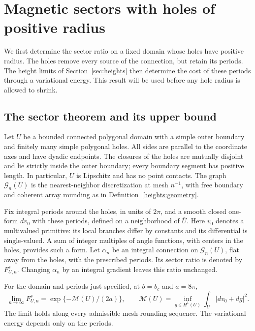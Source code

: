 \section{Magnetic sectors with holes of positive radius}
\label{sec:sectors}

We first determine the sector ratio on a fixed domain whose holes have
positive radius. The holes remove every source of the connection, but
retain its periods. The height limits of Section~\ref{sec:heights} then
determine the cost of these periods through a variational energy.
This result will be used before any hole radius is allowed to shrink.

\subsection{The sector theorem and its upper bound}

Let \(U\) be a bounded connected polygonal domain with a simple outer
boundary and finitely many simple polygonal holes. All sides are parallel
to the coordinate axes and have dyadic endpoints. The closures of the
holes are mutually disjoint and lie strictly inside the outer boundary;
every boundary segment has positive length. In particular, \(U\) is
Lipschitz and has no point contacts.
The graph \(\mathcal G_n(U)\) is the nearest-neighbor discretization at mesh
\(n^{-1}\), with free boundary and coherent array rounding as in
Definition~\ref{heights:geometry}.

Fix integral periods around the holes, in units of \(2\pi\), and a smooth
closed one-form \(dv_0\) with these periods, defined on a neighborhood
of \(\overline U\). Here \(v_0\) denotes a multivalued primitive:
its local branches differ by constants and its differential is
single-valued. A sum of integer multiples of angle functions, with centers
in the holes, provides such a form. Let \(\alpha_n\) be an integral
connection on \(\mathcal G_n(U)\), flat away from the holes, with the prescribed
periods. Its sector ratio is denoted by \(F_{U,n}^s\).
Changing \(\alpha_n\) by an integral gradient leaves this ratio unchanged.

\begin{theorem}\label{sectors:positive-radius}
For the domain and periods just specified, at \(b=b_c\) and
\(a=8\pi\),
\begin{equation}
 \lim_{n\to\infty}F_{U,n}^s
   =\exp\{-\mathcal M(U)/(2a)\},
 \qquad
 \mathcal M(U)=\inf_{g\in H^1(U)}
                    \int_U|dv_0+dg|^2 .
 \tag{3}\label{eq:source-3}
\end{equation}
The limit holds along every admissible mesh-rounding sequence.
The variational energy depends only on the periods.
\end{theorem}

